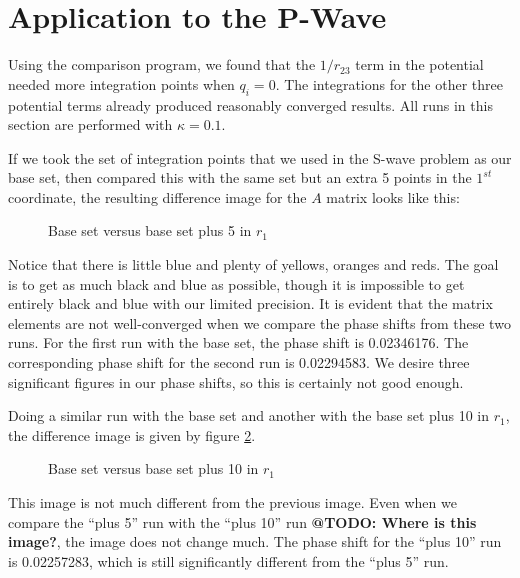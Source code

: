 \documentclass[Dissertation.tex]{subfiles}
\begin{document}
\section{Application to the P-Wave}

Using the comparison program, we found that the $1/r_{23}$ term in the potential needed more integration points when $q_i = 0$. The integrations for the other three potential terms already produced reasonably converged results. All runs in this section are performed with $\kappa = 0.1$.

If we took the set of integration points that we used in the S-wave problem as our base set, then compared this with the same set but an extra 5 points in the $1^{st}$ coordinate, the resulting difference image for the $A$ matrix looks like this:
\begin{figure}[H]
	\centering
	\caption{Base set versus base set plus 5 in $r_1$}
	\label{fig:BasevsBaseplus5}
\end{figure}
\noindent Notice that there is little blue and plenty of yellows, oranges and reds. The goal is to get as much black and blue as possible, though it is impossible to get entirely black and blue with our limited precision. It is evident that the matrix elements are not well-converged when we compare the phase shifts from these two runs. For the first run with the base set, the phase shift is 0.02346176. The corresponding phase shift for the second run is 0.02294583. We desire three significant figures in our phase shifts, so this is certainly not good enough.

Doing a similar run with the base set and another with the base set plus 10 in $r_1$, the difference image is given by figure \ref{fig:BasevsBaseplus10}.
\begin{figure}[H]
	\centering
	\caption{Base set versus base set plus 10 in $r_1$}
	\label{fig:BasevsBaseplus10}
\end{figure}
\noindent This image is not much different from the previous image. Even when we compare the ``plus 5'' run with the ``plus 10'' run \textbf{@TODO: Where is this image?}, the image does not change much. The phase shift for the ``plus 10'' run is 0.02257283, which is still significantly different from the ``plus 5'' run.
\end{document}
